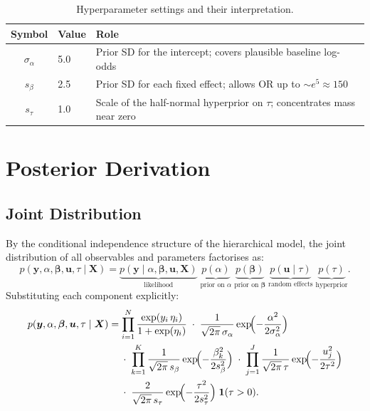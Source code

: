 \documentclass[10pt]{article}
\newcommand{\bX}{\bm{X}}
\newcommand{\by}{\bm{y}}
\newcommand{\bbeta}{\bm{\beta}}
\newcommand{\bu}{\bm{u}}
\begin{document}
\begin{table}[H]
\centering
\caption{Hyperparameter settings and their interpretation.}
\label{tab:hyperparams}
\begin{tabular}{cll}
\toprule
Symbol & Value & Role \\
\midrule
$\sigma_\alpha$ & 5.0 & Prior SD for the intercept; covers plausible baseline log-odds \\
$s_\beta$ & 2.5 & Prior SD for each fixed effect; allows OR up to $\sim e^{5} \approx 150$ \\
$s_\tau$ & 1.0 & Scale of the half-normal hyperprior on $\tau$; concentrates mass near zero \\
\bottomrule
\end{tabular}
\end{table}

\section{Posterior Derivation}
\label{sec:derivation}

\subsection{Joint Distribution}

By the conditional independence structure of the hierarchical model,
the joint distribution of all observables and parameters factorises as:
\begin{equation}\label{eq:joint}
  p(\by,\alpha,\bbeta,\bu,\tau \mid \bX)
  = \underbrace{p(\by \mid \alpha,\bbeta,\bu,\bX)}_{\text{likelihood}}
    \;\underbrace{p(\alpha)}_{\text{prior on }\alpha}
    \;\underbrace{p(\bbeta)}_{\text{prior on }\bbeta}
    \;\underbrace{p(\bu \mid \tau)}_{\text{random effects}}
    \;\underbrace{p(\tau)}_{\text{hyperprior}}.
\end{equation}
Substituting each component explicitly:
\begin{align}
  p(\by,\alpha,\bbeta,\bu,\tau \mid \bX)
  &= \prod_{i=1}^{N}\frac{\exp(y_i\,\eta_i)}{1+\exp(\eta_i)}
  \;\cdot\;
  \frac{1}{\sqrt{2\pi}\,\sigma_\alpha}
  \exp\!\Bigl(-\frac{\alpha^2}{2\sigma_\alpha^2}\Bigr)
  \notag\\
  &\quad\;\cdot\;
  \prod_{k=1}^{K}\frac{1}{\sqrt{2\pi}\,s_\beta}
  \exp\!\Bigl(-\frac{\beta_k^2}{2s_\beta^2}\Bigr)
  \;\cdot\;
  \prod_{j=1}^{J}\frac{1}{\sqrt{2\pi}\,\tau}
  \exp\!\Bigl(-\frac{u_j^2}{2\tau^2}\Bigr)
  \notag\\
  &\quad\;\cdot\;
  \frac{2}{\sqrt{2\pi}\,s_\tau}
  \exp\!\Bigl(-\frac{\tau^2}{2s_\tau^2}\Bigr)
  \;\mathbf{1}(\tau > 0).
  \label{eq:joint-full}
\end{align}
\end{document}
